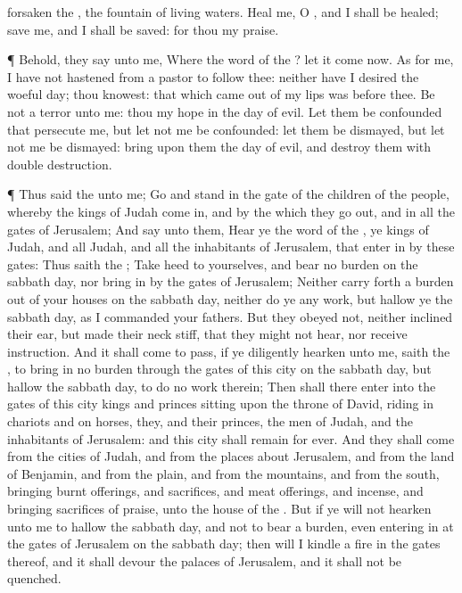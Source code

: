{forsaken the
{}, the
fountain of
living
waters.
Heal me, O
{}, and I shall be
healed;
save me, and I shall be
saved: for thou
{} my
praise.
\par }{\PP {}¶ Behold, they
say unto me, Where
{} the
word of the
{}? let it
come now.
As for me, I have not
hastened from
{} a
pastor to
follow thee: neither have I
desired the
woeful
day; thou
knowest: that which came
out of my
lips was
{}
before
thee.
Be not a
terror unto me: thou
{} my
hope in the
day of
evil.
Let them be
confounded that
persecute me, but let not me be
confounded: let them be
dismayed, but let not me be
dismayed:
bring upon them the
day of
evil, and
destroy them with
double
destruction.
\par }{\PP {}¶ Thus
said the
{} unto me;
Go and
stand in the
gate of the
children of the
people, whereby the
kings of
Judah come
in, and by the which they go
out, and in all the
gates of
Jerusalem;
And
say unto them,
Hear ye the
word of the
{}, ye
kings of
Judah, and all
Judah, and all the
inhabitants of
Jerusalem, that enter
in by these
gates:
Thus
saith the
{}; Take
heed to
yourselves, and
bear no
burden on the
sabbath
day, nor
bring
{} in by the
gates of
Jerusalem;
Neither carry
forth a
burden out of your
houses on the
sabbath
day, neither
do ye any
work, but
hallow ye the
sabbath
day, as I
commanded your
fathers.
But they
obeyed not, neither
inclined their
ear, but made their
neck
stiff, that they might not
hear, nor
receive
instruction.
And it shall come to pass, if ye
diligently
hearken unto me,
saith the
{}, to
bring in no
burden through the
gates of this
city on the
sabbath
day, but
hallow the
sabbath
day, to
do
no
work therein;
Then shall there
enter into the
gates of this
city
kings and
princes
sitting upon the
throne of
David,
riding in
chariots and on
horses, they, and their
princes, the
men of
Judah, and the
inhabitants of
Jerusalem: and this
city shall
remain for
ever.
And they shall
come from the
cities of
Judah, and from the places
about
Jerusalem, and from the
land of
Benjamin, and from the
plain, and from the
mountains, and from the
south,
bringing burnt
offerings, and
sacrifices, and meat
offerings, and
incense, and
bringing sacrifices of
praise, unto the
house of the
{}.
But if ye will not
hearken unto me to
hallow the
sabbath
day, and not to
bear a
burden, even entering
in at the
gates of
Jerusalem on the
sabbath
day; then will I
kindle a
fire in the
gates thereof, and it shall
devour the
palaces of
Jerusalem, and it shall not be
quenched.

}
